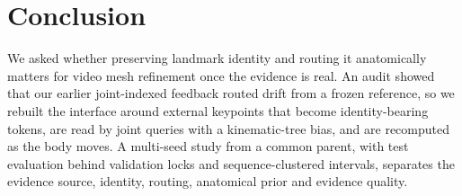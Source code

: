 \section{Conclusion}
\label{sec:conclusion}

We asked whether preserving landmark identity and routing it anatomically matters for video mesh refinement once the evidence is real.
An audit showed that our earlier joint-indexed feedback routed drift from a frozen reference, so we rebuilt the interface around external keypoints that become identity-bearing tokens, are read by joint queries with a kinematic-tree bias, and are recomputed as the body moves.
A multi-seed study from a common parent, with test evaluation behind validation locks and sequence-clustered intervals, separates the evidence source, identity, routing, anatomical prior and evidence quality.
